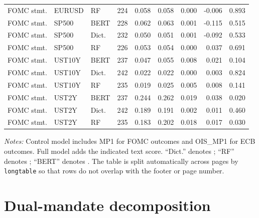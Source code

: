\begin{longtable}{@{}p{2.15cm}p{1.25cm}p{0.95cm}rrrrrr@{}}
FOMC stmt. & EURUSD & RF & 224 & 0.058 & 0.058 & 0.000 & -0.006 & 0.893 \\
FOMC stmt. & SP500 & BERT & 228 & 0.062 & 0.063 & 0.001 & -0.115 & 0.515 \\
FOMC stmt. & SP500 & Dict. & 232 & 0.050 & 0.051 & 0.001 & -0.092 & 0.533 \\
FOMC stmt. & SP500 & RF & 226 & 0.053 & 0.054 & 0.000 & 0.037 & 0.691 \\
FOMC stmt. & UST10Y & BERT & 237 & 0.047 & 0.055 & 0.008 & 0.021 & 0.104 \\
FOMC stmt. & UST10Y & Dict. & 242 & 0.022 & 0.022 & 0.000 & 0.003 & 0.824 \\
FOMC stmt. & UST10Y & RF & 235 & 0.019 & 0.025 & 0.005 & 0.008 & 0.141 \\
FOMC stmt. & UST2Y & BERT & 237 & 0.244 & 0.262 & 0.019 & 0.038 & 0.020 \\
FOMC stmt. & UST2Y & Dict. & 242 & 0.189 & 0.191 & 0.002 & 0.011 & 0.460 \\
FOMC stmt. & UST2Y & RF & 235 & 0.183 & 0.202 & 0.018 & 0.017 & 0.030 \\
\end{longtable}
\footnotesize\noindent\emph{Notes:} Control model includes MP1 for FOMC outcomes and
OIS\_MP1 for ECB outcomes. Full model adds the indicated text score. ``Dict.'' denotes
\netscore{}; ``RF'' denotes \rfscore{}; ``BERT'' denotes \bertscore{}. The table is
split automatically across pages by \texttt{longtable} so that rows do not overlap with
the footer or page number.
\endgroup

\section{Dual-mandate decomposition}
\label{app:a2_dual_decomposition}

